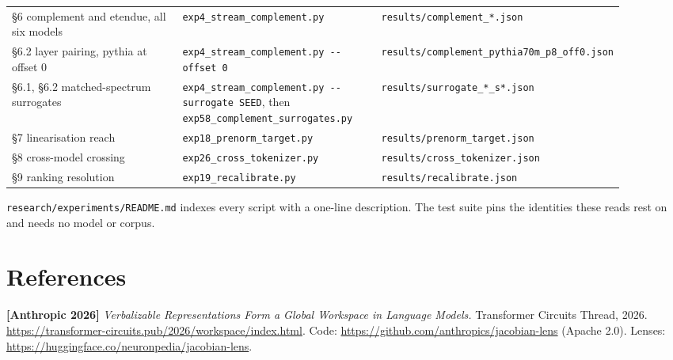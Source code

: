 \documentclass[10pt,letterpaper,twocolumn]{article}
\begin{document}
\begin{center}
{\begin{xtabular}{L{0.310\linewidth}L{0.338\linewidth}L{0.248\linewidth}}
§6 complement and etendue, all six models & \texttt{exp4\_\allowbreak{}stream\_\allowbreak{}complement.\allowbreak{}py} & \texttt{results/\allowbreak{}complement\_\allowbreak{}*\allowbreak{}.\allowbreak{}json} \\
§6.2 layer pairing, pythia at offset 0 & \texttt{exp4\_\allowbreak{}stream\_\allowbreak{}complement.\allowbreak{}py\ -{}\allowbreak{}-{}\allowbreak{}offset\ 0} & \texttt{results/\allowbreak{}complement\_\allowbreak{}pythia70m\_\allowbreak{}p8\_\allowbreak{}off0.\allowbreak{}json} \\
§6.1, §6.2 matched-spectrum surrogates & \texttt{exp4\_\allowbreak{}stream\_\allowbreak{}complement.\allowbreak{}py\ -{}\allowbreak{}-{}\allowbreak{}surrogate\ SEED},
then
\texttt{exp58\_\allowbreak{}complement\_\allowbreak{}surrogates.\allowbreak{}py} & \texttt{results/\allowbreak{}surrogate\_\allowbreak{}*\allowbreak{}\_\allowbreak{}s*\allowbreak{}.\allowbreak{}json} \\
§7 linearisation reach & \texttt{exp18\_\allowbreak{}prenorm\_\allowbreak{}target.\allowbreak{}py} & \texttt{results/\allowbreak{}prenorm\_\allowbreak{}target.\allowbreak{}json} \\
§8 cross-model crossing & \texttt{exp26\_\allowbreak{}cross\_\allowbreak{}tokenizer.\allowbreak{}py} & \texttt{results/\allowbreak{}cross\_\allowbreak{}tokenizer.\allowbreak{}json} \\
§9 ranking resolution & \texttt{exp19\_\allowbreak{}recalibrate.\allowbreak{}py} & \texttt{results/\allowbreak{}recalibrate.\allowbreak{}json} \\
\end{xtabular}
}
\end{center}

\texttt{research/\allowbreak{}experiments/\allowbreak{}README.\allowbreak{}md} indexes every script with a one-line description. The test suite
pins the identities these reads rest on and needs no model or corpus.

\section{References}\label{references}

\textbf{{[}Anthropic 2026{]}} \emph{Verbalizable Representations Form a Global Workspace in Language Models.} Transformer Circuits Thread, 2026. \href{https://transformer-circuits.pub/2026/workspace/index.html}{https:\allowbreak{}/\allowbreak{}/\allowbreak{}transfor\allowbreak{}mer-\allowbreak{}circuits\allowbreak{}.\allowbreak{}pub/\allowbreak{}2026/\allowbreak{}workspac\allowbreak{}e/\allowbreak{}index.\allowbreak{}html}. Code: \href{https://github.com/anthropics/jacobian-lens}{https:\allowbreak{}/\allowbreak{}/\allowbreak{}github.\allowbreak{}com/\allowbreak{}anthropi\allowbreak{}cs/\allowbreak{}jacobian\allowbreak{}-\allowbreak{}lens} (Apache 2.0). Lenses: \href{https://huggingface.co/neuronpedia/jacobian-lens}{https:\allowbreak{}/\allowbreak{}/\allowbreak{}huggingf\allowbreak{}ace.\allowbreak{}co/\allowbreak{}neuronpe\allowbreak{}dia/\allowbreak{}jacobian\allowbreak{}-\allowbreak{}lens}.
\end{document}
